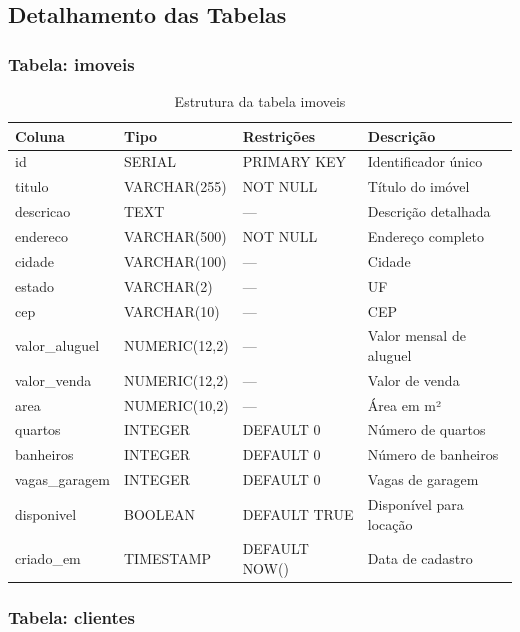 \documentclass[12pt, a4paper]{article}
\newcommand{\thead}[1]{\cellcolor{tableheader}\color{white}\bfseries #1}
\newcommand{\talt}{\rowcolor{tablerowalt}}
\begin{document}
\subsection{Detalhamento das Tabelas}

\subsubsection{Tabela: imoveis}

\begin{table}[H]
\centering
\begin{tabularx}{\textwidth}{|l|l|l|X|}
\hline
\thead{Coluna} & \thead{Tipo} & \thead{Restrições} & \thead{Descrição} \\
\hline
id             & SERIAL         & PRIMARY KEY  & Identificador único \\
\talt titulo        & VARCHAR(255)   & NOT NULL     & Título do imóvel \\
descricao      & TEXT           & —            & Descrição detalhada \\
\talt endereco      & VARCHAR(500)   & NOT NULL     & Endereço completo \\
cidade         & VARCHAR(100)   & —            & Cidade \\
\talt estado        & VARCHAR(2)     & —            & UF \\
cep            & VARCHAR(10)    & —            & CEP \\
\talt valor\_aluguel & NUMERIC(12,2) & —           & Valor mensal de aluguel \\
valor\_venda   & NUMERIC(12,2)  & —            & Valor de venda \\
\talt area          & NUMERIC(10,2)  & —            & Área em m² \\
quartos        & INTEGER        & DEFAULT 0    & Número de quartos \\
\talt banheiros     & INTEGER        & DEFAULT 0    & Número de banheiros \\
vagas\_garagem & INTEGER        & DEFAULT 0    & Vagas de garagem \\
\talt disponivel    & BOOLEAN        & DEFAULT TRUE & Disponível para locação \\
criado\_em     & TIMESTAMP      & DEFAULT NOW()& Data de cadastro \\
\hline
\end{tabularx}
\caption{Estrutura da tabela imoveis}
\end{table}

\subsubsection{Tabela: clientes}
\end{document}
